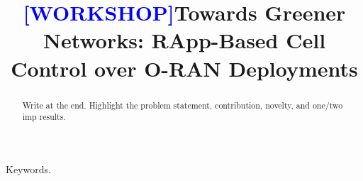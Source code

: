 \documentclass[conference]{IEEEtran}
\begin{document}
\title{\textcolor{blue}{[WORKSHOP]}Towards Greener Networks: RApp-Based Cell Control over O-RAN Deployments}

\author{
}

\maketitle

\begin{abstract}
Write at the end. Highlight the problem statement, contribution, novelty, and one/two imp results.
\end{abstract}

\begin{IEEEkeywords}
Keywords.
\end{IEEEkeywords}
\end{document}
